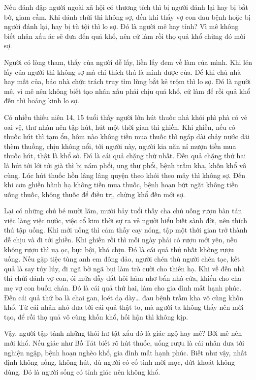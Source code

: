 \documentclass[
  12pt,
  oneside]{book}
\begin{document}
Nếu đánh đập người ngoài xã hội có thương tích thì bị người đánh lại hay bị bắt bớ, giam cầm. Khi đánh chửi thì không sợ, đến khi thấy vợ con đau bệnh hoặc bị người đánh lại, hay bị tù tội thì lo sợ. Đó là người mê hay tỉnh? Vì mê không biết nhân xấu ác sẽ đưa đến quả khổ, nên cứ làm rồi thọ quả khổ chừng đó mới sợ.

Người có lòng tham, thấy của người dễ lấy, liền lấy đem về làm của mình. Khi lén lấy của người thì không sợ mà chỉ thích thú là mình được của. Để khi chủ nhà hay mất của, báo nhà chức trách truy tìm lùng bắt kẻ trộm thì lo sợ. Đó là người mê, vì mê nên không biết tạo nhân xấu phải chịu quả khổ, cứ làm để rồi quả khổ đến thì hoảng kinh lo sợ.

Có nhiều thiếu niên 14, 15 tuổi thấy người lớn hút thuốc nhả khói phì phà có vẻ oai vệ, thư nhàn nên tập hút, hút một thời gian thì ghiền. Khi ghiền, nếu có thuốc hút thì tạm ổn, hôm nào không tiền mua thuốc thì ngáp dài chảy nước dãi thèm thuồng, chịu không nổi, tới người này, người kia năn nỉ mượn tiền mua thuốc hút, thật là khổ sở. Đó là cái quả chặng thứ nhất. Đến quả chặng thứ hai là hút tới lới tới già thì bị nám phổi, ung thư phổi, bệnh trầm kha, khốn khổ vô cùng. Lúc hút thuốc hồn lâng lâng quyện theo khói theo mây thì không sợ. Đến khi cơn ghiền hành hạ không tiền mua thuốc, bệnh hoạn bứt ngặt không tiền uống thuốc, không thuốc để điều trị, chừng khổ đến mới sợ.

Lại có những chú bé mười lăm, mười bảy tuổi thấy cha chú uống rượu bàn tán việc làng việc nước, việc cổ kim thời sự ra vẻ người hiểu biết sành đời, nên thích thú tập uống. Khi mới uống thì cảm thấy cay nóng, tập một thới gian trở thành dễ chịu và đi tới ghiền. Khi ghiền rồi thì mỗi ngày phải có rượu mới yên, nếu không rượu thì uạ ọc, bực bội, khó chịu. Đó là cái quả thứ nhất không rượu uống. Nếu gặp tiệc tùng anh em đông đảo, người chén thù người chén tạc, kết quả là say túy lúy, đi ngã bờ ngã bụi làm trò cười cho thiên hạ. Khi về đến nhà thì chửi đánh vợ con, ói mửa đầy đất hôi hám nhơ bẩn nhà cửa, khiến cho cha mẹ vợ con buồn chán. Đó là cái quả thứ hai, làm cho gia đình mất hạnh phúc. Đến cái quả thứ ba là chai gan, loét dạ dày\ldots{} đau bệnh trầm kha vô cùng khốn khổ. Từ cái nhân nhỏ đưa tới cái quả thật to, mà người ta không thấy nên mới tạo, để rồi thọ quả vô cùng khốn khổ, hối hận thì không kịp.

Vậy, người tập tành những thói hư tật xấu đó là giác ngộ hay mê? Bởi mê nên mới khổ. Nếu giác như Bồ Tát biết rõ hút thuốc, uống rượu là cái nhân đưa tới nghiện ngập, bệnh hoạn nghèo khổ, gia đình mất hạnh phúc. Biết như vậy, nhất định không uống, không hút, dù người có cố tình mời mọc, dứt khoát không dùng. Đó là người sống có tỉnh giác nên không khổ.
\end{document}
